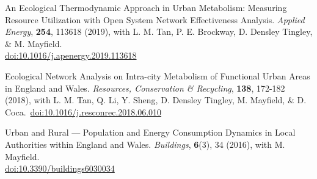 \documentclass[10pt]{article}
\begin{document}
\begin{etaremune}[leftmargin=0ex, topsep=0ex]
	\item An Ecological Thermodynamic Approach in Urban Metabolism: Measuring Resource Utilization with Open System Network Effectiveness Analysis. \emph{Applied Energy}, \textbf{254}, 113618 (2019), with L. M. Tan, P. E. Brockway, D. Densley Tingley, \& M. Mayfield.~\\\href{https://doi.org/10.1016/j.apenergy.2019.113618}{doi:10.1016/j.apenergy.2019.113618}
			
	\item Ecological Network Analysis on Intra-city Metabolism of Functional Urban Areas in England and Wales. \emph{Resources, Conservation \& Recycling}, \textbf{138}, 172-182 (2018), with L. M. Tan, Q. Li, Y. Sheng, D. Densley Tingley, M. Mayfield, \& D. Coca.~\href{https//doi.org/10.1016/j.resconrec.2018.06.010}{doi:10.1016/j.resconrec.2018.06.010}\label{sure.net}

	\item Urban and Rural --- Population and Energy Consumption Dynamics in Local Authorities within England and Wales. \emph{Buildings}, \textbf{6}(3), 34 (2016), with M. Mayfield.~\\\href{http://dx.doi.org/10.3390/buildings6030034}{doi:10.3390/buildings6030034}
	
\end{etaremune}
\renewcommand{\labelenumi}{R\theenumi.}
\end{document}
